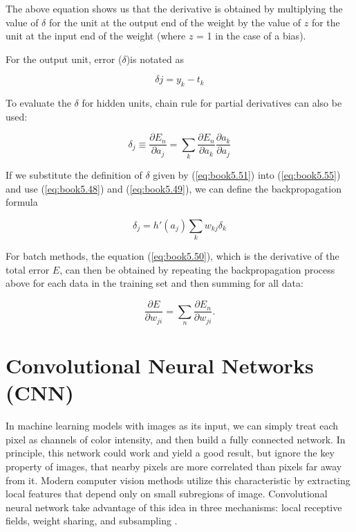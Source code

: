 \documentclass[ %
                    author={Revalda Putawara},
                supervisor={Dr. James Pope},
                    degree={MSc},
                     title={Robustness of Bayesian Neural Networks Design Choices Against Weight and Bias Perturbation Induced by Single Event Upsets (SEUs)},
                      type={},
                      year={2025}]{dissertation}
\begin{document}
The above equation shows us that the derivative is obtained by multiplying the value of $\delta$ for the unit at the output end of the weight by the value of $z$ for the unit at the input end of the weight (where $z$ = 1 in the case of a bias).

For the output unit, error ($\delta$)is notated as

\begin{equation}
{\delta j} = y_k - t_k
\end{equation}

To evaluate the $\delta$ for hidden units, chain rule for partial derivatives can also be used:

\begin{equation} \label{eq:book5.55}
\delta_j \equiv \frac{\partial E_n}{\partial a_j} = \sum_k \frac{\partial E_n}{\partial a_k} \frac{\partial a_k}{\partial a_j}
\end{equation}

If we substitute the definition of $\delta$ given by (\ref{eq:book5.51}) into  (\ref{eq:book5.55}) and use (\ref{eq:book5.48}) and (\ref{eq:book5.49}), we can define the backpropagation formula

\begin{equation} \label{eq:book5.56}
\delta_j = h'(a_j) \sum_k w_{kj} \delta_k
\end{equation}

For batch methods, the equation (\ref{eq:book5.50}), which is the derivative of the total error $E$, can then be obtained by repeating the backpropagation process above for each data in the training set and then summing for all data:

\begin{equation}
\frac{\partial E}{\partial w_{ji}} = \sum_n \frac{\partial E_n}{\partial w_{ji}}.
\end{equation}

\fi


\section{Convolutional Neural Networks (CNN)}

In machine learning models with images as its input, we can simply treat each pixel as channels of color intensity, and then build a fully connected network. In principle, this network could work and yield a good result, but ignore the key property of images, that nearby pixels are more correlated than pixels far away from it. Modern computer vision methods utilize this characteristic by extracting local features that depend only on small subregions of image. Convolutional neural network take advantage of this idea in three mechanisms: local receptive fields, weight sharing, and subsampling \cite{bishoppatternrecognition2007}.  
\end{document}
